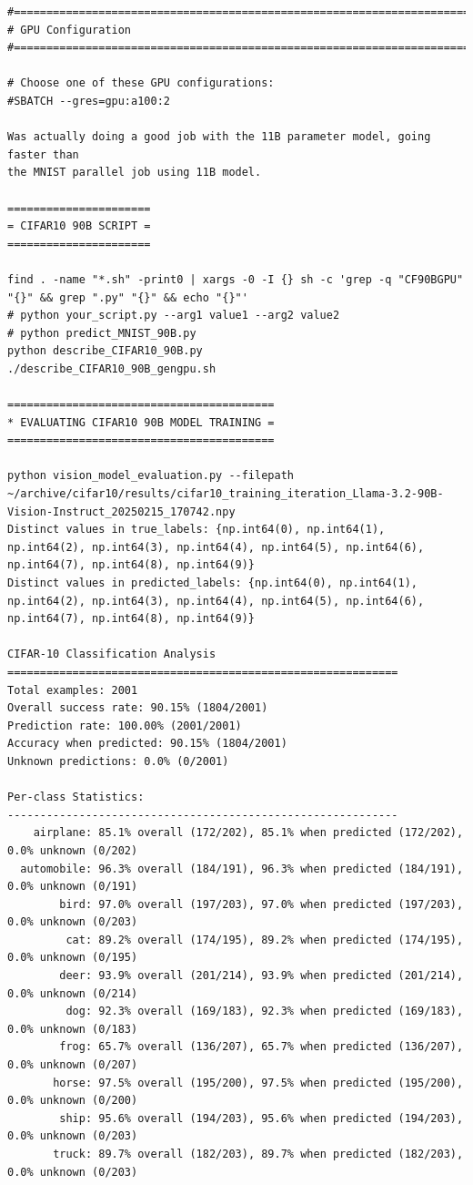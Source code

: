 \begin{verbatim}
#===============================================================================
# GPU Configuration
#===============================================================================

# Choose one of these GPU configurations:
#SBATCH --gres=gpu:a100:2 

Was actually doing a good job with the 11B parameter model, going faster than 
the MNIST parallel job using 11B model. 

======================
= CIFAR10 90B SCRIPT =
======================

find . -name "*.sh" -print0 | xargs -0 -I {} sh -c 'grep -q "CF90BGPU" "{}" && grep ".py" "{}" && echo "{}"'
# python your_script.py --arg1 value1 --arg2 value2
# python predict_MNIST_90B.py
python describe_CIFAR10_90B.py
./describe_CIFAR10_90B_gengpu.sh

=========================================
* EVALUATING CIFAR10 90B MODEL TRAINING =
=========================================

python vision_model_evaluation.py --filepath ~/archive/cifar10/results/cifar10_training_iteration_Llama-3.2-90B-Vision-Instruct_20250215_170742.npy
Distinct values in true_labels: {np.int64(0), np.int64(1), np.int64(2), np.int64(3), np.int64(4), np.int64(5), np.int64(6), np.int64(7), np.int64(8), np.int64(9)}
Distinct values in predicted_labels: {np.int64(0), np.int64(1), np.int64(2), np.int64(3), np.int64(4), np.int64(5), np.int64(6), np.int64(7), np.int64(8), np.int64(9)}

CIFAR-10 Classification Analysis
============================================================
Total examples: 2001
Overall success rate: 90.15% (1804/2001)
Prediction rate: 100.00% (2001/2001)
Accuracy when predicted: 90.15% (1804/2001)
Unknown predictions: 0.0% (0/2001)

Per-class Statistics:
------------------------------------------------------------
    airplane: 85.1% overall (172/202), 85.1% when predicted (172/202), 0.0% unknown (0/202)
  automobile: 96.3% overall (184/191), 96.3% when predicted (184/191), 0.0% unknown (0/191)
        bird: 97.0% overall (197/203), 97.0% when predicted (197/203), 0.0% unknown (0/203)
         cat: 89.2% overall (174/195), 89.2% when predicted (174/195), 0.0% unknown (0/195)
        deer: 93.9% overall (201/214), 93.9% when predicted (201/214), 0.0% unknown (0/214)
         dog: 92.3% overall (169/183), 92.3% when predicted (169/183), 0.0% unknown (0/183)
        frog: 65.7% overall (136/207), 65.7% when predicted (136/207), 0.0% unknown (0/207)
       horse: 97.5% overall (195/200), 97.5% when predicted (195/200), 0.0% unknown (0/200)
        ship: 95.6% overall (194/203), 95.6% when predicted (194/203), 0.0% unknown (0/203)
       truck: 89.7% overall (182/203), 89.7% when predicted (182/203), 0.0% unknown (0/203)


\end{verbatim}
